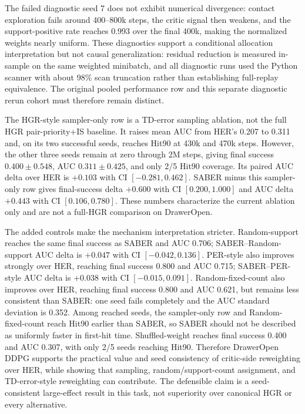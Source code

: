 \documentclass[letterpaper]{article}
\begin{document}
The failed diagnostic seed 7 does not exhibit numerical divergence: contact exploration fails around 400--800k steps, the critic signal then weakens, and the support-positive rate reaches 0.993 over the final 400k, making the normalized weights nearly uniform. These diagnostics support a conditional allocation interpretation but not causal generalization: residual reduction is measured in-sample on the same weighted minibatch, and all diagnostic runs used the Python scanner with about 98\% scan truncation rather than establishing full-replay equivalence. The original pooled performance row and this separate diagnostic rerun cohort must therefore remain distinct.

The HGR-style sampler-only row is a TD-error sampling ablation, not the full HGR pair-priority+IS baseline. It raises mean AUC from HER's 0.207 to 0.311 and, on its two successful seeds, reaches Hit90 at 430k and 470k steps. However, the other three seeds remain at zero through 2M steps, giving final success \(0.400\pm0.548\), AUC \(0.311\pm0.425\), and only 2/5 Hit90 coverage. Its paired AUC delta over HER is \(+0.103\) with CI \([-0.281,0.462]\). SABER minus this sampler-only row gives final-success delta \(+0.600\) with CI \([0.200,1.000]\) and AUC delta \(+0.443\) with CI \([0.106,0.780]\). These numbers characterize the current ablation only and are not a full-HGR comparison on DrawerOpen.

The added controls make the mechanism interpretation stricter. Random-support reaches the same final success as SABER and AUC 0.706; SABER--Random-support AUC delta is \(+0.047\) with CI \([-0.042,0.136]\). PER-style also improves strongly over HER, reaching final success 0.800 and AUC 0.715; SABER--PER-style AUC delta is \(+0.038\) with CI \([-0.015,0.091]\). Random-fixed-count also improves over HER, reaching final success 0.800 and AUC 0.621, but remains less consistent than SABER: one seed fails completely and the AUC standard deviation is 0.352. Among reached seeds, the sampler-only row and Random-fixed-count reach Hit90 earlier than SABER, so SABER should not be described as uniformly faster in first-hit time. Shuffled-weight reaches final success 0.400 and AUC 0.307, with only 2/5 seeds reaching Hit90. Therefore DrawerOpen DDPG supports the practical value and seed consistency of critic-side reweighting over HER, while showing that sampling, random/support-count assignment, and TD-error-style reweighting can contribute. The defensible claim is a seed-consistent large-effect result in this task, not superiority over canonical HGR or every alternative.
\end{document}
